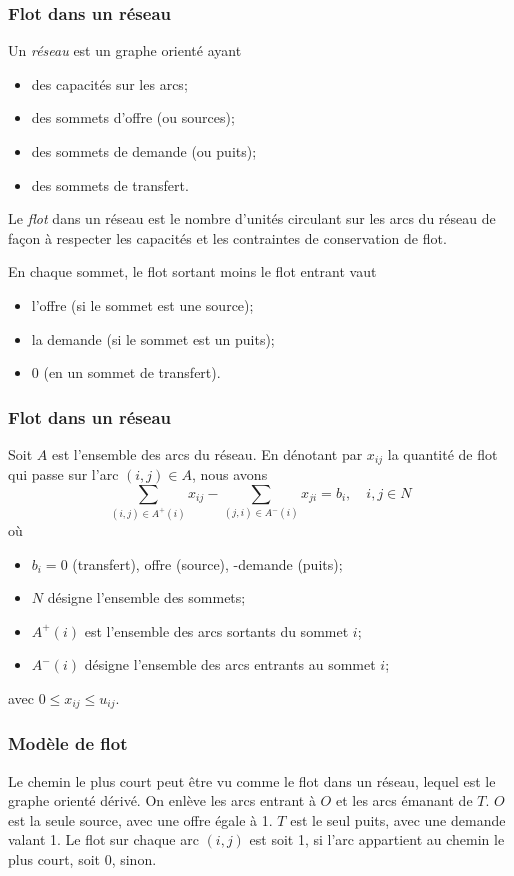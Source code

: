 \documentclass[usepdftitle=false]{beamer}
\begin{document}
\begin{frame}
\frametitle{Flot dans un réseau}

Un {\sl réseau} est un graphe orienté ayant
\begin{itemize}
	\item 
	des capacités sur les arcs;
	\item
	des sommets d'offre (ou sources);
	\item
	des sommets de demande (ou puits);
	\item
	des sommets de transfert.
\end{itemize}

\mbox{}

Le {\sl flot} dans un réseau est le nombre d'unités circulant sur les arcs du réseau de façon à respecter les capacités et les contraintes de conservation de flot.

\mbox{}

En chaque sommet, le flot sortant moins le flot entrant vaut
\begin{itemize}
	\item 
	l'offre (si le sommet est une source);
	\item
	la demande (si le sommet est un puits);
	\item
	0 (en un sommet de transfert).
\end{itemize}

\end{frame}

\begin{frame}
\frametitle{Flot dans un réseau}

Soit $A$ est l'ensemble des arcs du réseau.
En dénotant par $x_{ij}$ la quantité de flot qui passe sur l'arc $(i,j) \in A$, nous avons
\[
\sum_{(i,j) \in A^+(i)} x_{ij} - \sum_{(j,i) \in A^-(i) }x_{ji} = b_i,\quad i, j \in N
\]
où
\begin{itemize}
	\item 
	$b_i = 0$ (transfert), offre (source), -demande (puits);
	\item
	$N$ désigne l'ensemble des sommets;
	\item
	$A^+(i)$ est l'ensemble des arcs sortants du sommet $i$;
	\item
	$A^-(i)$ désigne l'ensemble des arcs entrants au sommet $i$;
\end{itemize}
avec $0 \leq x_{ij} \leq u_{ij}$.

\end{frame}

\begin{frame}
\frametitle{Modèle de flot}

Le chemin le plus court peut être vu comme le flot dans un réseau, lequel est le graphe orienté dérivé.
On enlève les arcs entrant à $O$ et les arcs émanant de $T$.
$O$ est la seule source, avec une offre égale à 1.
$T$ est le seul puits, avec une demande valant 1.
Le flot sur chaque arc $(i,j)$ est soit 1, si l'arc appartient au chemin le plus court, soit 0, sinon.

\end{frame}
\end{document}
